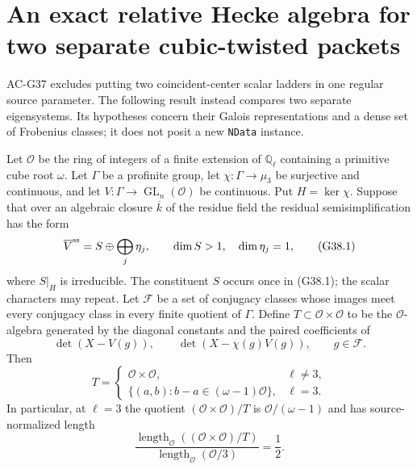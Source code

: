 \section{An exact relative Hecke algebra for two separate cubic-twisted packets}
\label{sec:relative-cubic-hecke}

AC-G37 excludes putting two coincident-center scalar ladders
in one regular source parameter.  The following result instead
compares two separate eigensystems.  Its hypotheses concern
their Galois representations and a dense set of Frobenius
classes; it does not posit a new \texttt{NData} instance.

\begin{theorem}
\label{AC-G38}
Let $\mathcal O$ be the ring of integers of a finite extension
of $\mathbb Q_\ell$ containing a primitive cube root $\omega$.
Let $\Gamma$ be a profinite group, let
$\chi:\Gamma\to\mu_3$ be surjective and continuous, and let
$V:\Gamma\to\operatorname{GL}_n(\mathcal O)$ be continuous.
Put $H=\ker\chi$.  Suppose that over an algebraic closure
$\overline k$ of the residue field the residual
semisimplification has the form
\[
        \overline V^{\rm ss}=S\oplus\bigoplus_j\eta_j,
 \qquad \dim S>1,\quad \dim\eta_j=1,                 \tag{G38.1}
\]
where $S|_H$ is irreducible.  The constituent $S$ occurs
once in (G38.1); the scalar characters may repeat.
Let $\mathcal F$ be a set of conjugacy classes whose images
meet every conjugacy class in every finite quotient of
$\Gamma$.  Define $T\subset\mathcal O\times\mathcal O$
to be the $\mathcal O$-algebra generated by the diagonal
constants and the paired coefficients of
\[
             \det(X-V(g)),\qquad\det(X-\chi(g)V(g)),
                         \qquad g\in\mathcal F.
\]
Then
\[
 T=
 \begin{cases}
   \mathcal O\times\mathcal O,&\ell\ne3,\\[2pt]
   \{(a,b):b-a\in(\omega-1)\mathcal O\},&\ell=3.
 \end{cases}                                                \tag{G38.3}
\]
In particular, at $\ell=3$ the quotient
$(\mathcal O\times\mathcal O)/T$ is
$\mathcal O/(\omega-1)$ and has source-normalized length
\[
 \frac{\operatorname{length}_{\mathcal O}
                  ((\mathcal O\times\mathcal O)/T)}
      {\operatorname{length}_{\mathcal O}(\mathcal O/3)}
                           =\frac12.                 \tag{G38.4}
\]
\end{theorem}
